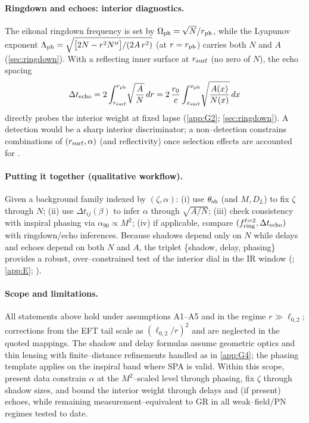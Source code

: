 \documentclass{iopjournal}
\begin{document}
\paragraph{Ringdown and echoes: interior diagnostics.}
The eikonal ringdown frequency is set by $\Omega_{\rm ph}=\sqrt{N}/r_{\rm ph}$, while the Lyapunov exponent $\Lambda_{\rm ph}=\sqrt{\big[2N-r^2N''\big]/(2A\,r^2)}$ (at $r=r_{\rm ph}$) carries both $N$ and $A$ (\cref{sec:ringdown}). With a reflecting inner surface at $r_{\rm surf}$ (no zero of $N$), the echo spacing
\[
\Delta t_{\rm echo}=2\int_{r_{\rm surf}}^{r_{\rm ph}}\!\sqrt{\frac{A}{N}}\,dr
=2\,\frac{r_0}{c}\int_{x_{\rm surf}}^{x_{\rm ph}}\!\sqrt{\frac{A(x)}{N(x)}}\,dx
\]
directly probes the interior weight at fixed lapse (\cref{app:G2}; \cref{sec:ringdown}). A detection would be a sharp interior discriminator; a non–detection constrains combinations of $(r_{\rm surf},\alpha)$ (and reflectivity) once selection effects are accounted for \cite{CardosoEchoes2016}.

\paragraph{Putting it together (qualitative workflow).}
Given a background family indexed by $(\zeta,\alpha)$:
(i) use $\theta_{\rm sh}$ (and $M,D_L$) to fix $\zeta$ through $N$;
(ii) use $\Delta t_{ij}(\beta)$ to infer $\alpha$ through $\sqrt{A/N}$;
(iii) check consistency with inspiral phasing via $\alpha_{90}\propto M^{2}$;
(iv) if applicable, compare $(f_{\rm ring}^{\ell=2},\Delta t_{\rm echo})$ with ringdown/echo inferences. Because shadows depend only on $N$ while delays and echoes depend on both $N$ and $A$, the triplet \{shadow, delay, phasing\} provides a robust, over–constrained test of the interior dial in the IR window (; \cref{app:E}; \cite{Perlick2004LRR,BlandfordNarayan1986,EHT2019M87,EHT2022SgrA}).

\paragraph{Scope and limitations.}
All statements above hold under assumptions A1–A5 and in the regime $r\gg\ell_{0,2}$; corrections from the EFT tail scale as $(\ell_{0,2}/r)^2$ and are neglected in the quoted mappings. The shadow and delay formulas assume geometric optics and thin lensing with finite–distance refinements handled as in \cref{app:G4}; the phasing template applies on the inspiral band where SPA is valid. Within this scope, present data constrain $\alpha$ at the $M^{2}$–scaled level through phasing, fix $\zeta$ through shadow sizes, and bound the interior weight through delays and (if present) echoes, while remaining measurement–equivalent to GR in all weak–field/PN regimes tested to date.
\end{document}
